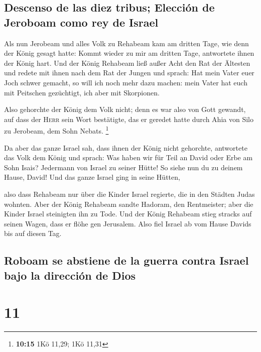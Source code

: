 \hypertarget{descenso-de-las-diez-tribus-elecciuxf3n-de-jeroboam-como-rey-de-israel}{%
\subsection{Descenso de las diez tribus; Elección de Jeroboam como rey
de
Israel}\label{descenso-de-las-diez-tribus-elecciuxf3n-de-jeroboam-como-rey-de-israel}}

 Als nun Jerobeam und alles Volk zu Rehabeam kam am
dritten Tage, wie denn der König gesagt hatte: Kommt wieder zu mir am
dritten Tage,  antwortete ihnen der König hart. Und der
König Rehabeam ließ außer Acht den Rat der Ältesten  und
redete mit ihnen nach dem Rat der Jungen und sprach: Hat mein Vater euer
Joch schwer gemacht, so will ich noch mehr dazu machen: mein Vater hat
euch mit Peitschen gezüchtigt, ich aber mit Skorpionen.

 Also gehorchte der König dem Volk nicht; denn es war
also von Gott gewandt, auf dass der \textsc{Herr} sein Wort bestätigte,
das er geredet hatte durch Ahia von Silo zu Jerobeam, dem Sohn Nebats.
\footnote{\textbf{10:15} 1Kö 11,29; 1Kö 11,31}

 Da aber das ganze Israel sah, dass ihnen der König nicht
gehorchte, antwortete das Volk dem König und sprach: Was haben wir für
Teil an David oder Erbe am Sohn Isais? Jedermann von Israel zu seiner
Hütte! So siehe nun du zu deinem Hause, David! Und das ganze Israel ging
in seine Hütten,

 also dass Rehabeam nur über die Kinder Israel regierte,
die in den Städten Judas wohnten.  Aber der König
Rehabeam sandte Hadoram, den Rentmeister; aber die Kinder Israel
steinigten ihn zu Tode. Und der König Rehabeam stieg stracks auf seinen
Wagen, dass er flöhe gen Jerusalem.  Also fiel Israel ab
vom Hause Davids bis auf diesen Tag.

\hypertarget{roboam-se-abstiene-de-la-guerra-contra-israel-bajo-la-direcciuxf3n-de-dios}{%
\subsection{Roboam se abstiene de la guerra contra Israel bajo la
dirección de
Dios}\label{roboam-se-abstiene-de-la-guerra-contra-israel-bajo-la-direcciuxf3n-de-dios}}

\hypertarget{section-10}{%
\section{11}\label{section-10}}

